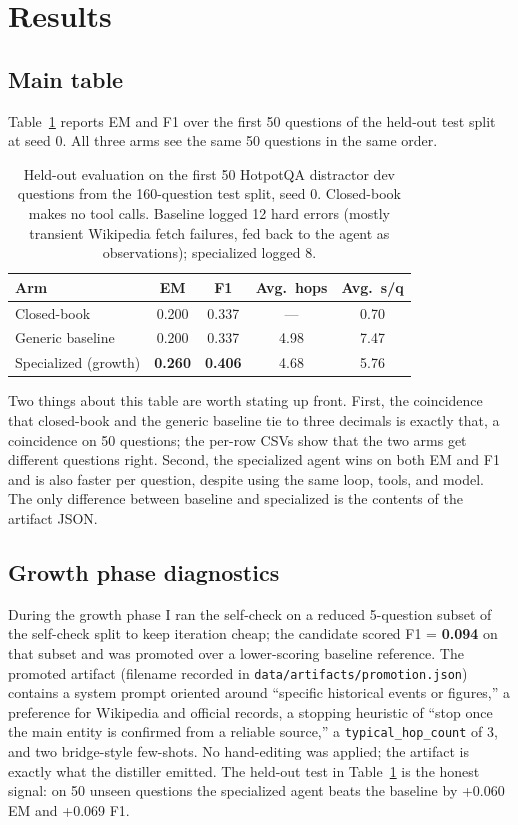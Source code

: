 \documentclass[11pt,a4paper]{article}
\begin{document}
\section{Results}

\subsection{Main table}

Table~\ref{tab:main} reports EM and F1 over the first 50 questions of
the held-out test split at seed 0. All three arms see the same 50
questions in the same order.

\begin{table}[h]
\centering
\begin{tabular}{lcccc}
\toprule
Arm & EM & F1 & Avg.\ hops & Avg.\ s/q \\
\midrule
Closed-book          & 0.200 & 0.337 & ---   & 0.70 \\
Generic baseline     & 0.200 & 0.337 & 4.98  & 7.47 \\
Specialized (growth) & \textbf{0.260} & \textbf{0.406} & 4.68 & 5.76 \\
\bottomrule
\end{tabular}
\caption{Held-out evaluation on the first 50 HotpotQA distractor dev
questions from the 160-question test split, seed 0. Closed-book makes
no tool calls. Baseline logged 12 hard errors (mostly transient
Wikipedia fetch failures, fed back to the agent as observations);
specialized logged 8.}
\label{tab:main}
\end{table}

Two things about this table are worth stating up front. First, the
coincidence that closed-book and the generic baseline tie to three
decimals is exactly that, a coincidence on 50 questions; the per-row
CSVs show that the two arms get different questions right. Second,
the specialized agent wins on both EM and F1 and is also faster per
question, despite using the same loop, tools, and model. The only
difference between baseline and specialized is the contents of the
artifact JSON.

\subsection{Growth phase diagnostics}

During the growth phase I ran the self-check on a reduced 5-question
subset of the self-check split to keep iteration cheap; the candidate
scored F1 = \textbf{0.094} on that subset and was promoted over a
lower-scoring baseline reference. The promoted artifact (filename
recorded in \texttt{data/artifacts/promotion.json}) contains a system
prompt oriented around ``specific historical events or figures,'' a
preference for Wikipedia and official records, a stopping heuristic
of ``stop once the main entity is confirmed from a reliable source,''
a \texttt{typical\_hop\_count} of 3, and two bridge-style few-shots.
No hand-editing was applied; the artifact is exactly what the
distiller emitted. The held-out test in Table~\ref{tab:main} is the
honest signal: on 50 unseen questions the specialized agent beats the
baseline by +0.060 EM and +0.069 F1.
\end{document}
